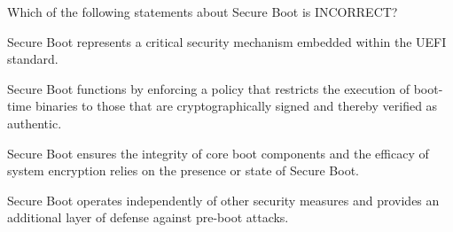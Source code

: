 \documentclass{exam-zh}
\begin{document}
\begin{question}
  Which of the following statements about Secure Boot is INCORRECT?
  \begin{choices}
  \item Secure Boot represents a critical security mechanism embedded within the UEFI standard.

  \item Secure Boot functions by enforcing a policy that restricts the execution of boot-time binaries to those that are cryptographically signed and thereby verified as authentic.

  \item Secure Boot ensures the integrity of core boot components and the efficacy of system encryption relies on the presence or state of Secure Boot.

  \item Secure Boot operates independently of other security measures and provides an additional layer of defense against pre-boot attacks.
  \end{choices}
\end{question}
\end{document}
